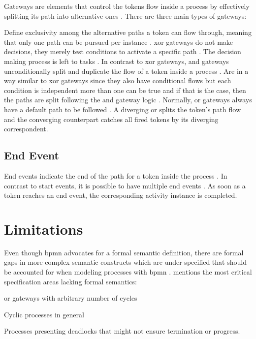 Gateways are elements that control the tokens flow inside a process by effectively splitting its path into alternative ones \citep{Silver2011}. There are three main types of gateways:

\begin{enumerate}
	 Define exclusivity among the alternative paths a token can flow through, meaning that only one path can be pursued per instance \citep{Silver2011}. \gls{xor} gateways do not make decisions, they merely test conditions to activate a specific path \citep{Silver2011}. The decision making process is left to tasks \citep{Silver2011}.
	 In contrast to \gls{xor} gateways, \gls{and} gateways unconditionally split and duplicate the flow of a token inside a process \citep{Silver2011}.
	 Are in a way similar to \gls{xor} gateways since they also have conditional flows but each condition is independent \ie more than one can be true and if that is the case, then the paths are split following the \gls{and} gateway logic \citep{Silver2011}. Normally, \gls{or} gateways always have a default path to be followed \citep{Silver2011}. A diverging \gls{or} splits the token's path flow and the converging counterpart catches all fired tokens by its diverging correspondent.
\end{enumerate}

\subsection{End Event}

End events indicate the end of the path for a token inside the process \citep{Silver2011}. In contrast to start events, it is possible to have multiple end events \citep{Silver2011}. As soon as a token reaches an end event, the corresponding activity instance is completed.

\section{ Limitations}

Even though \gls{bpmn} advocates for a formal semantic definition, there are formal gaps in more complex semantic constructs which are under-specified that should be accounted for when modeling processes with \gls{bpmn} \citep{Soerensen2005}. \citet{Soerensen2005} mentions the most critical specification areas lacking formal semantics:
\begin{enumerate*}
	\item \gls{or} gateways with arbitrary number of cycles
	\item Cyclic processes in general
	\item Processes presenting deadlocks that might not ensure termination or progress.
\end{enumerate*}


